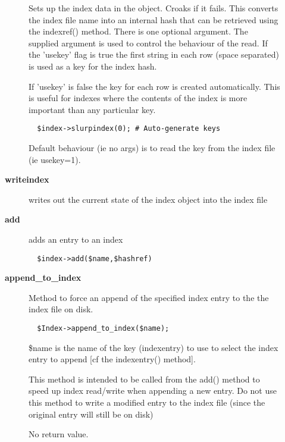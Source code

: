 \begin{description}
\begin{description}
Sets up the index data in the object. Croaks if it fails.  This
converts the index file name into an internal hash that can be
retrieved using the indexref() method.  There is one optional
argument.  The supplied argument is used to control the behaviour of
the read. If the 'usekey' flag is true the first string in each row
(space separated) is used as a key for the index hash.



If 'usekey' is false the key for each row is created 
automatically. This is useful for indexes where the contents 
of the index is more important than any particular key.

\begin{verbatim}
  $index->slurpindex(0); # Auto-generate keys
\end{verbatim}


Default behaviour (ie no args) is to read the key from the
index file (ie usekey=1).


\item[{\textbf{writeindex}}] \mbox{}

writes out the current state of the index object into the index file


\item[{\textbf{add}}] \mbox{}

adds an entry to an index

\begin{verbatim}
  $index->add($name,$hashref)
\end{verbatim}

\item[{\textbf{append\_to\_index}}] \mbox{}

Method to force an append of the specified index entry to the
the index file on disk.

\begin{verbatim}
  $Index->append_to_index($name);
\end{verbatim}


\$name is the name of the key (indexentry) to use to select the
index entry to append [cf the indexentry() method].



This method is intended to be called from the add() method
to speed up index read/write when appending a new entry.
Do not use this method to write a modified entry to the
index file (since the original entry will still be on disk)



No return value.



\end{description}
\end{description}
